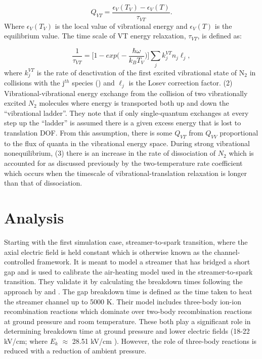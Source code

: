 \documentclass[]{article}
\begin{document}
	\[ Q_{VT} = \frac{\epsilon_V(T_V) - \epsilon_V(T)}{\tau_{VT}}. \]
	Where $\epsilon_V(T_V)$ is the local value of vibrational energy and $\epsilon_V(T)$ is the equilibrium value. The time scale of VT energy relaxation, $\tau_{VT}$, is defined as:
	
	\[ \frac{1}{\tau_{VT}} = \big[1 - exp\big(-\frac{\hbar\omega}{k_BT_V}\big)\big]\sum_{j}k_j^{VT}n_j\ell_j, \] where $k_j^{VT}$ is the rate of deactivation of the first excited vibrational state of N$_2$ in collisions with the j$^{th}$ species () and $\ell_j$ is the Losev correction factor. (2) Vibrational-vibrational energy exchange from the collision of two vibrationally excited $N_2$ molecules where energy is transported both up and down the ``vibrational ladder''. They note that if only single-quantum exchanges at every step up the ``ladder'' is assumed there is a given excess energy that is lost to translation DOF. From this assumption, there is some $Q_{VT}$ from $Q_{VV}$ proportional to the flux of quanta in the vibrational energy space. During strong vibrational nonequilibrium, (3) there is an increase in the rate of dissociation of $N_2$ which is accounted for as discussed previously by the two-temperature rate coefficient which occurs when the timescale of vibrational-translation relaxation is longer than that of dissociation.

\section{Analysis}	
	Starting with the first simulation case, streamer-to-spark transition, where the axial electric field is held constant which is otherwise known as the channel-controlled framework. It is meant to model a streamer that has bridged a short gap and is used to calibrate the air-heating model used in the streamer-to-spark transition. They validate it by calculating the breakdown times following the approach by \citet{Naidis:2005} and \citet{Riousset:2010}. The gap breakdown time is defined as the time taken to heat the streamer channel up to 5000 K. Their model includes three-body ion-ion recombination reactions which dominate over two-body recombination reactions at ground pressure and room temperature. These both play a significant role in determining breakdown time at ground pressure and lower electric fields (18-22 kV/cm; where $E_k$ $\approx$ 28.51 kV/cm \citep{Benilov:2003}). However, the role of three-body reactions is reduced with a reduction of ambient pressure. 
	
\end{document}
